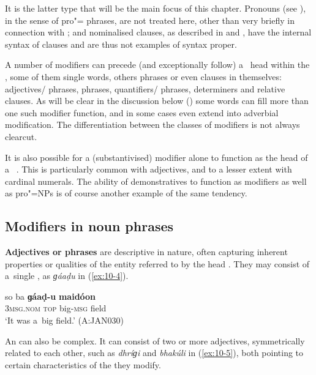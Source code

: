 It is the latter type that will be the main focus of this chapter. Pronouns (see ), in the sense of pro"= phrases, are not treated here, other than very briefly in connection with ; and nominalised clauses, as described in  and , have the internal syntax of clauses and are thus not examples of   syntax proper. 


A number of modifiers can precede (and exceptionally follow) a~ head within the  , some of them single words, others phrases or even clauses in themselves: adjectives/ phrases,  phrases, quantifiers/{\allowbreak} phrases, determiners and relative clauses. As will be clear in the discussion below () some words can fill more than one such modifier function, and in some cases even extend into adverbial modification. The differentiation between the classes of modifiers is not always clearcut.


It is also possible for a (substantivised) modifier alone to function as the head of a~ . This is particularly common with adjectives, and to a lesser extent with cardinal numerals. The ability of demonstratives to function as modifiers as well as pro"=NPs is of course another example of the same tendency.


\subsection{Modifiers in {noun} phrases}
\label{subsec:10-1-2}


\textbf{Adjectives or  phrases} are descriptive in nature, often capturing inherent properties or qualities of the entity referred to by the head . They may consist of a~single , as \textit{ɡáaḍu} in (\ref{ex:10-4}).

\begin{exe}
\ex
\label{ex:10-4}
\gll so ba \textbf{ɡáaḍ-u} \textbf{maidóon} \\
\textsc{3msg.nom} \textsc{top} big-\textsc{msg} field \\
\glt `It was a~big field.' (A:JAN030)
\end{exe}

An   can also be complex. It can consist of two or more adjectives, symmetrically related to each other, such as \textit{dhríɡi} and \textit{bhakúli} in (\ref{ex:10-5}), both pointing to certain characteristics of the  they modify. 

